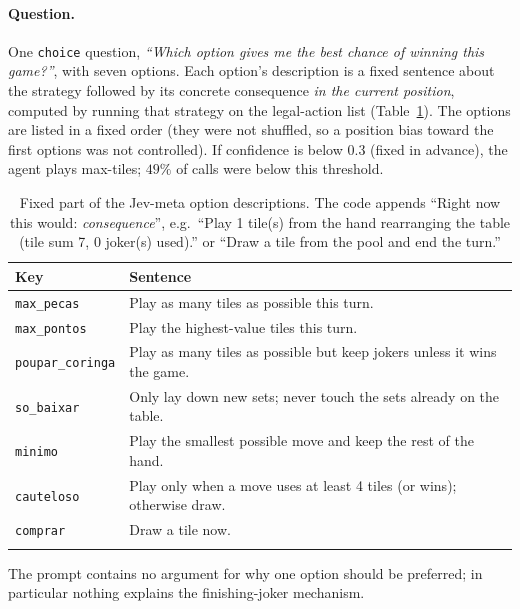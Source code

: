 \paragraph{Question.} One \texttt{choice} question, \emph{``Which option gives me the best chance of winning this game?''}, with seven options. Each option's description is a fixed sentence about the strategy followed by its concrete consequence \emph{in the current position}, computed by running that strategy on the legal-action list (Table~\ref{tab:jevopts}). The options are listed in a fixed order (they were not shuffled, so a position bias toward the first options was not controlled). If confidence is below $0.3$ (fixed in advance), the agent plays max-tiles; $49\%$ of calls were below this threshold.
\begin{table}[h]\centering\small
\caption{Fixed part of the Jev-meta option descriptions. The code appends ``Right now this would: \emph{consequence}'', e.g.\ ``Play 1 tile(s) from the hand rearranging the table (tile sum 7, 0 joker(s) used).'' or ``Draw a tile from the pool and end the turn.''}\label{tab:jevopts}
\begin{tabular}{@{}lp{}@{}}\toprule
Key & Sentence\\\midrule
\texttt{max\_pecas} & Play as many tiles as possible this turn. \\
\texttt{max\_pontos} & Play the highest-value tiles this turn. \\
\texttt{poupar\_coringa} & Play as many tiles as possible but keep jokers unless it wins the game. \\
\texttt{so\_baixar} & Only lay down new sets; never touch the sets already on the table. \\
\texttt{minimo} & Play the smallest possible move and keep the rest of the hand. \\
\texttt{cauteloso} & Play only when a move uses at least 4 tiles (or wins); otherwise draw. \\
\texttt{comprar} & Draw a tile now. \\
\\\bottomrule\end{tabular}\end{table}
The prompt contains no argument for why one option should be preferred; in particular nothing explains the finishing-joker mechanism.


